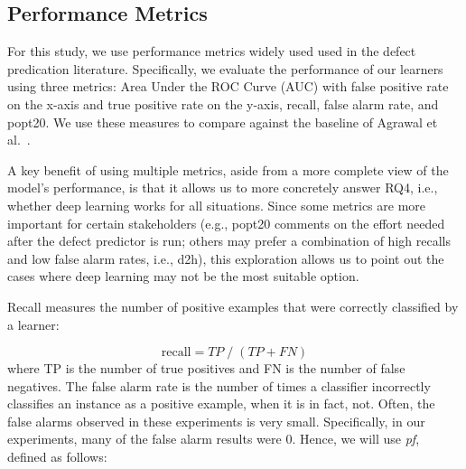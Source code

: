 \documentclass[10pt,compsoc,twocolumn]{IEEEtran}
\newcommand{\bi}{\begin{itemize}}
\newcommand{\ei}{\end{itemize}}
\newcommand{\respto}[1]{
\fcolorbox{black}{black!15}{%
\label{resp:#1}%
\bf\scriptsize R{#1}}}
\newcommand{\BLUE}{\color{blue}}
\newcommand{\BLACK}{\color{black}}
\begin{document}





\subsection{Performance Metrics}\label{sec:perfs}
For this study, we use   performance metrics widely used     used in 
the defect predication literature.
Specifically, we evaluate the performance of our learners using three metrics: Area Under the ROC Curve (AUC) with false positive rate on the x-axis and true positive rate on the y-axis, recall, false alarm rate, and popt20. We use these measures to compare against the baseline of Agrawal et al.~\cite{agrawal2019dodge}.

\BLUE
A key benefit of using multiple metrics, aside from a more complete view of the model's performance, is that it allows us to more concretely answer RQ4, i.e., whether deep learning works for all situations. Since some metrics are more important for certain stakeholders (e.g., popt20 comments on the effort needed after the defect predictor is run; others may prefer a combination of high recalls and low false alarm rates, i.e., d2h), this exploration allows us to point out the cases where deep learning may not be the most suitable option.
\respto{3a2.3}
\BLACK

Recall measures the number of positive examples that were correctly classified by a learner:

\[
    \text{recall} = \mathit{TP}\;/\;(\mathit{TP}+\mathit{FN})
\]
where TP is the number of true positives and FN is the number of false negatives.
The false alarm rate is the number of times a classifier incorrectly classifies an instance as a positive example, when it is in fact, not. Often, the false alarms observed in these experiments is very
small. Specifically, in our experiments, many of the false alarm results were 0. Hence, we will use {\em pf}, defined as follows:
\end{document}
